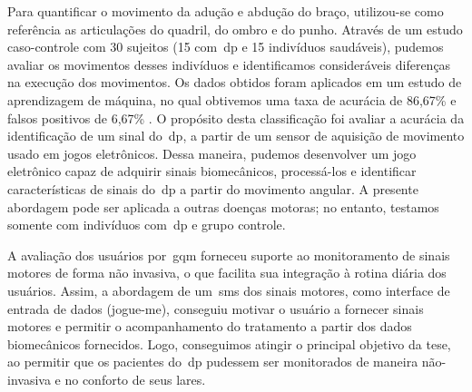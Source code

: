 Para quantificar o movimento da adução e abdução do braço, utilizou-se como referência as articulações do quadril, do ombro e do punho. Através de um estudo caso-controle com 30 sujeitos (15 com~\ac{dp} e 15 indivíduos saudáveis), pudemos avaliar os movimentos desses indivíduos e identificamos consideráveis diferenças na execução dos movimentos. Os dados obtidos foram aplicados em um estudo de aprendizagem de máquina, no qual obtivemos uma taxa de acurácia de 86,67\% e falsos positivos de 6,67\% . O propósito desta classificação foi avaliar a acurácia da identificação de um sinal do~\ac{dp}, a partir de um sensor de aquisição de movimento usado em jogos eletrônicos. Dessa maneira, pudemos desenvolver um jogo eletrônico  capaz de adquirir sinais biomecânicos, processá-los e identificar características de sinais do~\ac{dp} a partir do movimento angular. A presente abordagem pode ser aplicada a outras doenças motoras; no entanto, testamos somente com indivíduos com~\ac{dp} e grupo controle.

A avaliação dos usuários por~\ac{gqm} forneceu suporte ao monitoramento de sinais motores de forma não invasiva, o que facilita sua integração à rotina diária dos usuários. Assim, a abordagem de um~\ac{sms} dos sinais motores, como interface de entrada de dados (\ac{jogue-me}), conseguiu motivar o usuário  a fornecer sinais motores e permitir o acompanhamento do tratamento a partir dos dados biomecânicos fornecidos. Logo, conseguimos atingir o principal objetivo da tese, ao permitir que os pacientes do~\ac{dp} pudessem ser monitorados de maneira não-invasiva e no conforto de seus lares.


